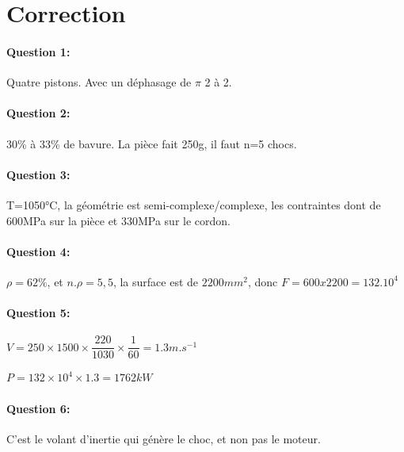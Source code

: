 \section{Correction}

\paragraph{Question 1:} Quatre pistons. Avec un déphasage de $\pi$ 2 à 2.

\paragraph{Question 2:} 30\% à 33\% de bavure. La pièce fait 250g, il faut n=5 chocs.

\paragraph{Question 3:} T=1050°C, la géométrie est semi-complexe/complexe, les contraintes dont de 600MPa sur la pièce et 330MPa sur le cordon.

\paragraph{Question 4:} $\rho=62\%$, et $n.\rho=5,5$, la surface est de $2200mm^2$, donc $F=600x2200=132.10^4$
  
\paragraph{Question 5:} $V=250\times 1500\times \dfrac{220}{1030}\times \dfrac{1}{60}=1.3m.s^{-1}$

$P=132\times 10^4\times 1.3=1762kW$

\paragraph{Question 6:} C'est le volant d'inertie qui génère le choc, et non pas le moteur.


